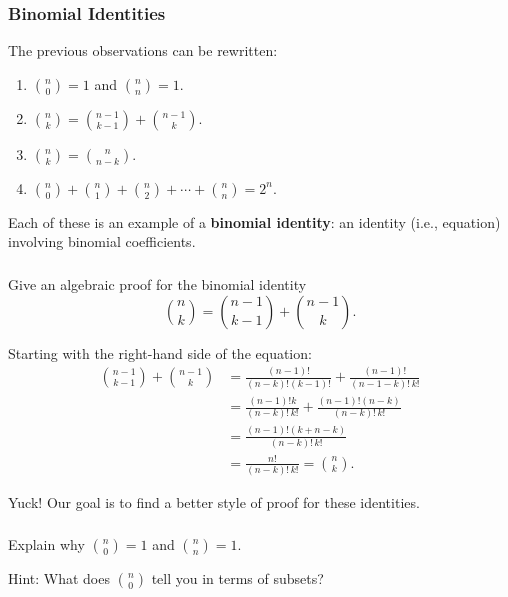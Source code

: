 \documentclass[11pt, compress]{beamer}
\newcommand{\amp}{&}
\newcommand{\terminology}[1]{\textbf{#1}}
\begin{document}
\begin{frame}
\frametitle{Binomial Identities}
 The previous observations can be rewritten:\begin{enumerate}
\item{} \({n \choose 0} = 1\) and \({n \choose n} = 1\).

\item{} \({n \choose k} = {n-1 \choose k-1} + {n-1 \choose k}\).

\item{} \({n \choose k} = {n \choose n-k}\).

\item{} \({n\choose 0} + {n \choose 1} + {n \choose 2} + \cdots + {n \choose n} = 2^n\).
\end{enumerate}

 
\pause \vfill 

Each of these is an example of a \terminology{binomial identity}: an identity (i.e., equation) involving binomial coefficients.
\end{frame}
 
\begin{frame}
\frametitle{}
\begin{example}[1.4.1]Give an algebraic proof for the binomial identity%
\begin{equation*}
{n \choose k} = {n-1\choose k-1} + {n-1 \choose k}\text{.}
\end{equation*}


\pause \vfill 

Starting with the right-hand side of the equation:%
\begin{align*}
{n-1 \choose k-1} + {n-1 \choose k} \amp = \frac{(n-1)!}{(n-k)!(k-1)!}+ \frac{(n-1)!}{(n-1-k)!\,k!}\\
\amp = \frac{(n-1)!k}{(n-k)!\,k!} + \frac{(n-1)!(n-k)}{(n-k)!\,k!}\\
\amp = \frac{(n-1)!(k+n-k)}{(n-k)!\,k!}\\
\amp = \frac{n!}{(n-k)!\, k!} = {n \choose k}\text{.}
\end{align*}


\pause \vfill 

Yuck!  Our goal is to find a better style of proof for these identities.
\end{example}
\end{frame}
 
\begin{frame}
\frametitle{}
\begin{example}[1.4.2]Explain why \({n \choose 0} = 1\) and \({n \choose n} = 1\).

\pause \vfill 

Hint: What does \(\binom{n}{0}\) tell you in terms of subsets?
\end{example}
\end{frame}
 
\end{document}
